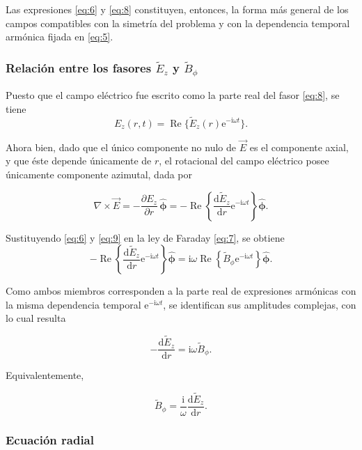 \documentclass{article}
\numberwithin{equation}{section}
\newcommand{\e}{\mathrm{e}}
\newcommand{\iu}{\mathrm{i}}
\newcommand{\ud}{\mathrm{d}}
\newcommand{\pp}[2]{\frac{\partial #1}{\partial #2}}
\newcommand{\hp}{\hat{\boldsymbol\phi}}
\begin{document}
Las expresiones \eqref{eq:6} y \eqref{eq:8} constituyen, entonces, la forma más general de los campos compatibles con la simetría del problema y con la dependencia temporal armónica fijada en \eqref{eq:5}.

\subsubsection{Relación entre los fasores $\widetilde E_z$ y $\widetilde B_\phi$}

Puesto que el campo eléctrico fue escrito como la parte real del fasor \eqref{eq:8}, se tiene
\begin{equation*}
    E_z(r,t)=\operatorname{Re}\{\widetilde E_z(r)\e^{-\iu\omega t}\}.
\end{equation*}

Ahora bien, dado que el único componente no nulo de $\vec E$ es el componente axial, y que éste depende únicamente de $r$, el rotacional del campo eléctrico posee únicamente componente azimutal, dada por

\begin{equation}\tag{9}\label{eq:9}
    \nabla\times \vec E=-\pp{E_z}{r}\,\hp=-\operatorname{Re}\left\{\frac{\ud \widetilde E_z}{\ud r}\e^{-\iu\omega t}\right\}\hp.
\end{equation}

Sustituyendo \eqref{eq:6} y \eqref{eq:9} en la ley de Faraday \eqref{eq:7}, se obtiene
\begin{equation*}
    -\operatorname{Re}\left\{\frac{\ud \widetilde E_z}{\ud r}\e^{-\iu\omega t}\right\}\hp
    =\iu\omega\operatorname{Re}\left\{\widetilde B_{\phi}\e^{-\iu\omega t}\right\}\hp.
\end{equation*}

Como ambos miembros corresponden a la parte real de expresiones armónicas con la misma dependencia temporal $\e^{-\iu\omega t}$, se identifican sus amplitudes complejas, con lo cual resulta

\begin{equation}\tag{10}\label{eq:10}
    -\frac{\ud \widetilde E_z}{\ud r}=\iu\omega\widetilde B_{\phi}.
\end{equation}

Equivalentemente,

\begin{equation}\tag{11}\label{eq:11}
    \widetilde B_{\phi}=\frac{\iu}{\omega}\frac{\ud \widetilde E_z}{\ud r}.
\end{equation}

\subsubsection{Ecuación radial}
\end{document}
